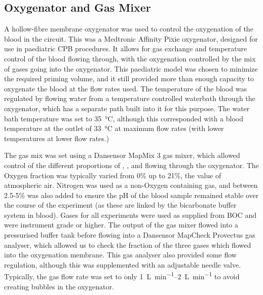 \subsection{Oxygenator and Gas Mixer}
A hollow-fibre membrane oxygenator was used to control the oxygenation of the blood in the circuit.
This was a Medtronic Affinity Pixie oxygenator, designed for use in paediatric CPB procedures.
It allows for gas exchange and temperature control of the blood flowing through, with the oxygenation controlled by the mix of gases going into the oxygenator.
This paediatric model was chosen to minimize the required priming volume, and it still provided more than enough capacity to oxygenate the blood at the flow rates used.
The temperature of the blood was regulated by flowing water from a temperature controlled waterbath through the oxygenator, which has a separate path built into it for this purpose.
The water bath temperature was set to \SI{35}{\degreeCelsius}, although this corresponded with a blood temperature at the outlet of \SI{33}{\degreeCelsius} at maximum flow rates (with lower temperatures at lower flow rates.)

The gas mix was set using a Dansensor MapMix 3 gas mixer, which allowed control of the different proportions of \Ntwo, \Otwo, and \COtwo flowing through the oxygenator.
The Oxygen fraction was typically varied from 0\% up to 21\%, the value of atmospheric air.
Nitrogen was used as a non-Oxygen containing gas, and between 2.5-5\% \COtwo was also added to ensure the pH of the blood sample remained stable over the course of the experiment (as these are linked by the bicarbonate buffer system in blood).
Gases for all experiments were used as supplied from BOC and were instrument grade or higher.
The output of the gas mixer flowed into a pressurised buffer tank before flowing into a Dansensor MapCheck Provectus gas analyser, which allowed us to check the fraction of the three gases which flowed into the oxygenation membrane.
This gas analyser also provided some flow regulation, although this was supplemented with an adjustable needle valve.
Typically, the gas flow rate was set to only \SIrange[per-mode=symbol]{1}{2}{\liter\per\minute} to avoid creating bubbles in the oxygenator.

